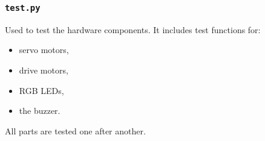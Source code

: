     \subsubsection*{\texttt{test.py}}
    Used to test the hardware components. It includes test functions for:
    \begin{itemize}
        \item servo motors,
        \item drive motors,
        \item RGB LEDs,
        \item the buzzer.
    \end{itemize}
    All parts are tested one after another.
